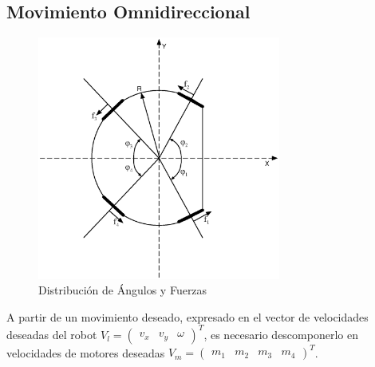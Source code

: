 \documentclass[twocolumn,10pt]{amrob}
\begin{document}
\subsection*{Movimiento Omnidireccional}
\begin{figure}
  \centering
    \includegraphics[width=8cm]{anglesRobot.eps}
  \caption{Distribución de Ángulos y Fuerzas}
  \label{fig:angFzaDiag}
\end{figure}
A partir de un movimiento deseado, expresado en el vector de velocidades deseadas del robot \( V_l= \begin{pmatrix} v_x & v_y & \omega \end{pmatrix}^{T} \), es necesario descomponerlo en velocidades de motores deseadas \( V_m= \begin {pmatrix} m_1 & m_2 & m_3 & m_4 \end{pmatrix}^{T} \). 
\end{document}

